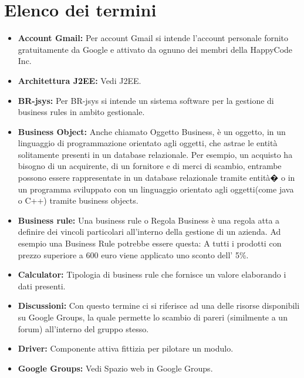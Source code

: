 \documentclass[11pt,titlepage,a4paper]{report}
\begin{document}
\chapter{Elenco dei termini}
\begin{itemize}

\item{\textbf{Account Gmail:}
Per account Gmail si intende l'account personale fornito gratuitamente da Google e attivato da ognuno dei membri della HappyCode Inc.}

\item{\textbf{Architettura J2EE:}
Vedi J2EE.}

\item{\textbf{BR-jsys:}
Per BR-jsys si intende un sistema software per la gestione di business rules in ambito gestionale.}

\item{\textbf{Business Object:}
Anche chiamato Oggetto Business, \`e un oggetto, in un linguaggio di programmazione orientato agli oggetti, che astrae le entit\`a solitamente presenti in un database relazionale.
Per esempio, un acquisto ha bisogno di un acquirente, di un fornitore e di merci di scambio, entrambe possono essere rappresentate in un database relazionale tramite entit\`a� o in un programma sviluppato con un linguaggio orientato agli oggetti(come java o C++) tramite business objects.}

\item{\textbf{Business rule:}
Una business rule o Regola Business \`e una regola atta a definire dei vincoli particolari all'interno della gestione di un azienda. Ad esempio una Business Rule potrebbe essere questa: A tutti i prodotti con prezzo superiore a 600 euro  viene applicato uno sconto dell' 5\%.}

\item{\textbf{Calculator:}
Tipologia di business rule che fornisce un valore elaborando i dati presenti.}

\item{\textbf{Discussioni:}
Con questo termine ci si riferisce ad una delle risorse disponibili su Google Groups, la quale permette lo scambio di pareri (similmente a un forum) all'interno del gruppo stesso.}

\item{\textbf{Driver:}
Componente attiva fittizia per pilotare un modulo.}

\item{\textbf{Google Groups:}
Vedi Spazio web in Google Groups. }


\end{itemize}
\end{document}
